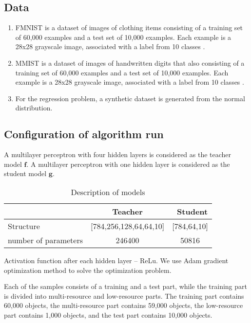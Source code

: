 \documentclass[12pt]{article}
\begin{document}
\subsection{Data}
\begin{enumerate}
    \item FMNIST is a dataset of images of clothing items consisting of a training set of 60,000 examples and a test set of 10,000 examples. Each example is a 28x28 grayscale image, associated with a label from 10 classes  \citep{FMNIST}.
    \item MMIST is a dataset of images of handwritten digits that also consisting of a training set of 60,000 examples and a test set of 10,000 examples. Each example is a 28x28 grayscale image, associated with a label from 10 classes \citep{MNIST}.
    \item For the regression problem, a synthetic dataset is generated from the normal distribution.
\end{enumerate}
\subsection{Configuration of algorithm run}
A multilayer perceptron with four hidden layers is considered as the teacher model $\textbf{f}$. A multilayer perceptron with one hidden layer is considered as the student model $\textbf{g}$.
\begin{table}[h!t]
\begin{center}
\caption{Description of models}
\label{table_1}
\begin{tabular}{|c|c|c|}
\hline
	 & Teacher &\ Student\\
	\hline
	\multicolumn{1}{|l|}{Structure}
	& [784,256,128,64,64,10]& [784,64,10]\\
	\hline
	\multicolumn{1}{|l|}{number of parameters}
	& 246400 & 50816\\
\hline

\end{tabular}
\end{center}
\end{table}


Activation function after each hidden layer -- ReLu. 
We use Adam gradient optimization method \citep{Adam} to solve the optimization problem.

Each of the samples consists of a training and a test part, while the training part is divided into multi-resource and low-resource parts. The training part contains 60,000 objects, the multi-resource part contains 59,000 objects, the low-resource part contains 1,000 objects, and the test part contains 10,000 objects.
\end{document}
